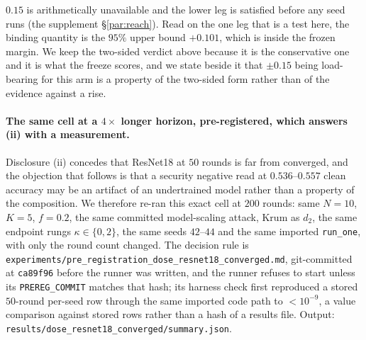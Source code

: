\documentclass{article}
\begin{document}
$0.15$ is arithmetically unavailable and the lower leg is satisfied before any seed runs (the supplement §\ref{par:reach}). Read on the one leg that is a test here, the binding quantity is the $95\%$ upper bound $+0.101$, which is inside the frozen margin. We keep the two-sided verdict above because it is the conservative one and it is what the freeze scores, and we state beside it that $\pm0.15$ being load-bearing for this arm is a property of the two-sided form rather than of the evidence against a rise.
\label{app:resnet18_dose}

\paragraph{The same cell at a $4\times$ longer horizon, pre-registered, which answers (ii) with a measurement.} Disclosure (ii) concedes that ResNet18 at $50$ rounds is far from converged, and the objection that follows is that a security negative read at $0.536$--$0.557$ clean accuracy may be an artifact of an undertrained model rather than a property of the composition. We therefore re-ran this exact cell at $200$ rounds: same $N{=}10$, $K{=}5$, $f{=}0.2$, the same committed model-scaling attack, Krum as $d_2$, the same endpoint rungs $\kappa \in \{0,2\}$, the same seeds $42$--$44$ and the same imported \texttt{run\_one}, with only the round count changed. The decision rule is \texttt{experiments/\allowbreak pre\_registration\_dose\_resnet18\_converged.md}, git-committed at \texttt{ca89f96} before the runner was written, and the runner refuses to start unless its \texttt{PREREG\_COMMIT} matches that hash; its harness check first reproduced a stored $50$-round per-seed row through the same imported code path to $<10^{-9}$, a value comparison against stored rows rather than a hash of a results file. Output: \texttt{results/\allowbreak dose\_resnet18\_converged/\allowbreak summary.json}.
\end{document}
